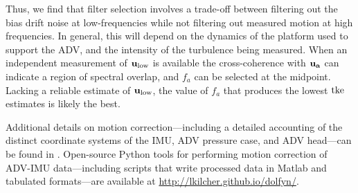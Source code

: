 Thus, we find that filter selection involves a trade-off between filtering out the bias drift noise at low-frequencies while not filtering out measured motion at high frequencies. In general, this will depend on the dynamics of the platform used to support the ADV, and the intensity of the turbulence being measured. When an independent measurement of $\ulow$ is available the cross-coherence with $\uacc$ can indicate a region of spectral overlap, and $f_a$ can be selected at the midpoint. Lacking a reliable estimate of $\ulow$,  the value of $f_a$ that produces the lowest $\mathrm{tke}$ estimates is likely the best. 

Additional details on motion correction---including a detailed accounting of the distinct coordinate systems of the IMU, ADV pressure case, and ADV head---can be found in \cite{Kilcher++2016}. Open-source Python tools for performing motion correction of ADV-IMU data---including scripts that write processed data in Matlab and tabulated formats---are available at \url{http://lkilcher.github.io/dolfyn/}.

\def\ue{\ensuremath{\vec{u}\earth}}

